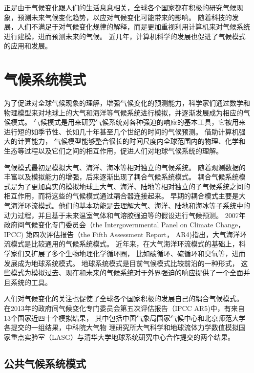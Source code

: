  
正是由于气候变化跟人们的生活息息相关，全球各个国家都在积极的研究气候现象，预测未来气候变化趋势，以应对气候变化可能带来的影响。 
随着科技的发展，人们不满足于对气候变化规律的解释，而是更加重视利用计算机来对气候系统进行建模，进而预测未来的气候。
近几年，计算机科学的发展也促进了气候模式的应用和发展。  



 
\section{气候系统模式}

为了促进对全球气候现象的理解，增强气候变化的预测能力，科学家们通过数学和物理模型来对地球上的大气和海洋等气候系统进行模拟，并逐渐发展成为相应的气候模式。
气候模式是用来研究气候系统对各种强迫的响应的基本工具，它被用来进行短的如季节性、长如几十年甚至几个世纪的时间的气候预测。 
借助计算机强大的计算能力， 气候模型能够整合很长的时间尺度内全球范围内的物理、化学和生态等过程以及它们之间的相互作用，促进人们对地球气候系统的理解\cite{hurrell2013community}。


气候模式最初是模拟大气、海洋、海冰等相对独立的气候系统。
随着观测数据的丰富以及模拟能力的增强，后来逐渐出现了耦合气候系统模式。
耦合气候系统模式是为了更加真实的模拟地球上大气、海洋、陆地等相对独立的子气候系统之间的相互作用，而将这些的气候模式通过耦合器连接起来\cite{hurrell2013community, liu2014c}。
早期的耦合模式主要是大气海洋环流模式。他们的基本功能是去理解大气、海洋、陆地和海冰等子系统中的动力过程，并且基于未来温室气体和气溶胶强迫等的假设进行气候预测。
2007年政府间气候变化专门委员会（the
Intergovernmental Panel on Climate Change， IPCC) 第四次评估报告（the Fifth Assessment
Report， AR4)指出，大气海洋环流模式是比较通用的气候系统模式\cite{solomon2007climate}。
近年来，在大气海洋环流模式的基础上，科学家们又扩展了多个生物地理化学循环圈， 比如碳循环、硫循环和臭氧等，进而发展成为地球系统模式。 地球系统模式是目前气候模式比较前沿的一种形式，
这些模式为模拟过去、现在和未来的气候系统对于外界强迫的响应提供了一个全面并且系统的工具。 

人们对气候变化的关注也促使了全球各个国家积极的发展自己的耦合气候模式。
在2013年的政府间气候变化专门委员会第五次评估报告（IPCC AR5)中，有来自13个国家近四十个模拟结果，
其中包括中国气象局国家气候中心和北京师范大学各提交的一组结果，中科院大气物
理研究所大气科学和地球流体力学数值模拟国家重点实验室（LASG）与清华大学地球系统研究中心合作提交的两个结果\cite{stocker2013ipcc}。



\subsection{公共气候系统模式}
 

